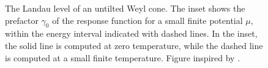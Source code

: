 \begin{figure}[htb]
  \centering
  
  \caption{The Landau level of an untilted Weyl cone.
    The inset shows the prefactor \( \gamma_0 \) of the response function for a small finite potential \( \mu \), within the energy interval indicated with dashed lines.
    In the inset, the solid line is computed at zero temperature, while the dashed line is computed at a small finite temperature.
    Figure inspired by \textcite{arjonaFingerprintsConformalAnomaly2019}.
    }
    \label{fig:platau}
\end{figure}

